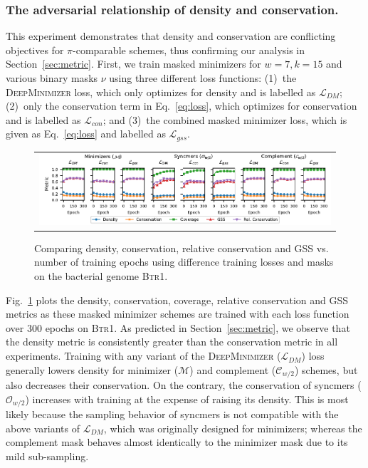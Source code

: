 \subsubsection{The adversarial relationship of density and conservation.}
This experiment demonstrates that density and conservation are conflicting objectives for $\pi$-comparable schemes, thus confirming our analysis in Section~\ref{sec:metric}. First, we train masked minimizers for $w=7, k=15$ and various binary masks $\nu$ using three different loss functions: (1)~the \textsc{DeepMinimizer} loss, which only optimizes for density and is labelled as $\mathcal{L}_{DM}$; (2)~only the conservation term in Eq.~\eqref{eq:loss}, which optimizes for conservation and is labelled as $\mathcal{L}_{con}$; and (3)~the combined masked minimizer loss, which is given as Eq.~\eqref{eq:loss} and labelled as $\mathcal{L}_{gss}$. 

\begin{figure}[ht]
\centering
\begin{tabular}{c}
\hspace{-1.7mm}\includegraphics[scale=1.03]{masked_mnz_plots/fig1/w7_k15.pdf}
\end{tabular}    
\caption{Comparing density, conservation, relative conservation and GSS vs. number of training epochs using difference training losses and masks on the bacterial genome \textsc{Btr1}.}
\label{fig:1}
\end{figure}
Fig.~\ref{fig:1} plots the density, conservation, coverage, relative conservation and GSS metrics as these masked minimizer schemes are trained with each loss function over $300$ epochs on \textsc{Btr1}. As predicted in Section~\ref{sec:metric}, we observe that the density metric is consistently greater than the conservation metric in all experiments. Training with any variant of the \textsc{DeepMinimizer} ($\mathcal{L}_{DM}$) loss generally lowers density for minimizer ($\mathcal{M}$) and complement ($\mathcal{C}_{w/2}$) schemes, but also decreases their conservation. On the contrary, the conservation of syncmers ($\mathcal{O}_{w/2}$) increases with training at the expense of raising its density. This is most likely because the sampling behavior of syncmers is not compatible with the above variants of $\mathcal{L}_{DM}$, which was originally designed for minimizers; whereas the complement mask behaves almost identically to the minimizer mask due to its mild sub-sampling.

